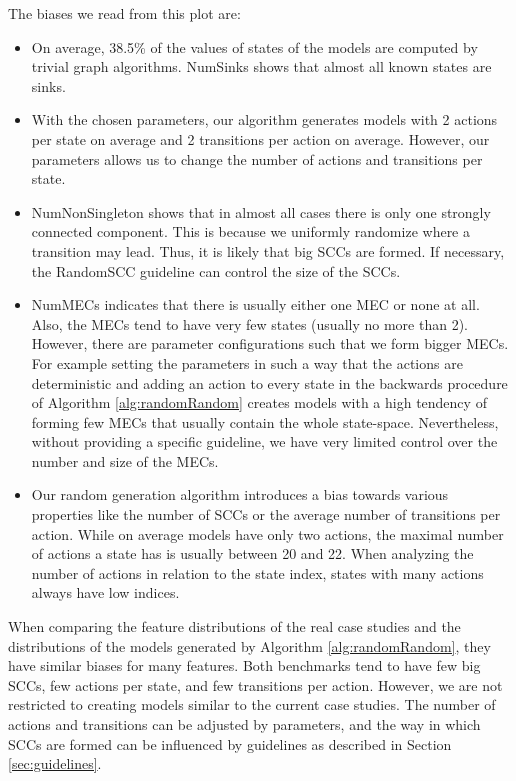 The biases we read from this plot are:
\begin{itemize} \label{insights:randomRandom}
    \item On average, 38.5\% of the values of states of the models are computed by trivial graph algorithms. NumSinks shows that almost all known states are sinks.
    \item With the chosen parameters, our algorithm generates models with 2 actions per state on average
     and 2 transitions per action on average.     
     However, our parameters allows us to change the number of actions and transitions per state.
    \item NumNonSingleton shows that in almost all cases there is only one strongly connected component.
        This is because we uniformly randomize where a transition may lead. Thus, it is likely that big SCCs are formed. 
        If necessary, the RandomSCC guideline can control the size of the SCCs.
    \item NumMECs indicates that there is usually either one MEC or none at all. Also, the MECs tend to have very few states (usually no more than 2).
    However, there are parameter configurations such that we form bigger MECs. For example setting the parameters in such a way that the actions are deterministic
    and adding an action to every state in the backwards procedure of Algorithm \ref{alg:randomRandom} creates models with a high tendency of forming few MECs that usually contain the whole state-space.
    Nevertheless, without providing a specific guideline, we have very limited control over the number and size of the MECs.
    \item Our random generation algorithm introduces a bias towards various properties like the number of SCCs or the average number of transitions per action.
    While on average models have only two actions, the maximal number of actions a state has is usually between 20 and 22.
    When analyzing the number of actions in relation to the state index, states with many actions always have low indices.
\end{itemize}

When comparing the feature distributions of the real case studies and the distributions of the models generated by Algorithm \ref{alg:randomRandom},
they have similar biases for many features. Both benchmarks tend to have few big SCCs, few actions per state, and few transitions per action.
However, we are not restricted to creating models similar to the current case studies. The number of actions and transitions can be adjusted by parameters,
and the way in which SCCs are formed can be influenced by guidelines as described in Section \ref{sec:guidelines}.

